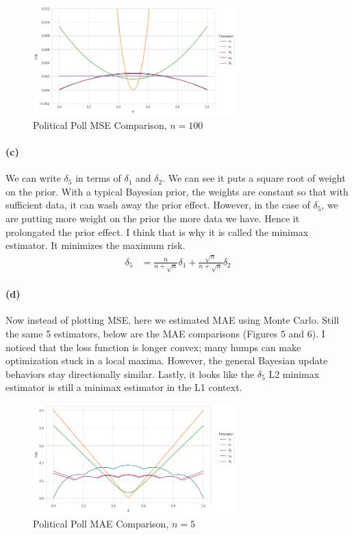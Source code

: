 \documentclass[11pt, letterpaper]{article}
\begin{document}
\begin{figure}[!h]
  \centering
  \includegraphics[width=0.7\textwidth]{3.b.2.png}
  \captionsetup{justification=centering}
  \caption{Political Poll MSE Comparison, $n = 100$}
\end{figure}

\paragraph{(c)}
We can write $\delta_5$ in terms of $\delta_1$ and $\delta_2$. We can see it puts a square root of weight on the prior. With a typical Bayesian prior, the weights are constant so that with sufficient data, it can wash away the prior effect. However, in the case of $\delta_5$, we are putting more weight on the prior the more data we have. Hence it prolongated the prior effect. I think that is why it is called the minimax estimator. It minimizes the maximum risk.
\begin{align*}
    \delta_5 &= \frac{n}{n + \sqrt{n}} \delta_1 + \frac{\sqrt{n}}{n+\sqrt{n}} \delta_2
\end{align*}

\paragraph{(d)}
Now instead of plotting MSE, here we estimated MAE using Monte Carlo. Still the same 5 estimators, below are the MAE comparisons (Figures 5 and 6). I noticed that the loss function is longer convex; many humps can make optimization stuck in a local maxima. However, the general Bayesian update behaviors stay directionally similar. Lastly, it looks like the $\delta_5$ L2 minimax estimator is still a minimax estimator in the L1 context.
\begin{figure}[!h]
  \centering
  \includegraphics[width=0.7\textwidth]{3.d.1.png}
  \captionsetup{justification=centering}
  \caption{Political Poll MAE Comparison, $n = 5$}
\end{figure}
\end{document}
